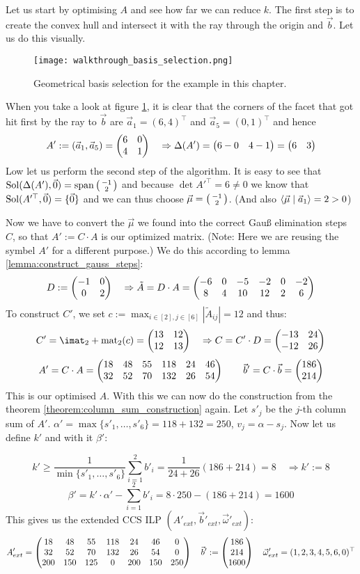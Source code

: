 Let us start by optimising $A$ and see how far we can reduce $k$. The first step is to create the convex hull and intersect it with the ray through the origin and $\vec b$. Let us do this visually.
\begin{figure}
    \centering
    \texttt{[image: walkthrough\_basis\_selection.png]}
    \caption{\label{fig:walkthrough_basis_selection} Geometrical basis selection for the example in this chapter.}
\end{figure}
When you take a look at figure \ref{fig:walkthrough_basis_selection}, it is clear that the corners of the facet that got hit first by the ray to $\vec b$ are $\vec a_1 = (6, 4)^\top$ and $\vec a_5 = (0, 1)^\top$ and hence
$$A' := (\vec a_1, \vec a_5) = \left(\begin{matrix}6&0\\4&1\end{matrix}\right) \quad \Rightarrow \Delta(A') = \left(\begin{matrix}6-0&4-1\end{matrix}\right) = \left(\begin{matrix}6&3\end{matrix}\right)$$
Low let us perform the second step of the algorithm. It is easy to see that $\operatorname{Sol}(\Delta(A'), \vec 0) = \operatorname{span}\left(\begin{smallmatrix}-1\\2\end{smallmatrix}\right)$ and because $\det A'^\top = 6 \neq 0$ we know that $\operatorname{Sol}(A'^\top, \vec 0) = \{\vec 0\}$ and we can thus choose $\vec\mu = \left(\begin{smallmatrix}-1\\2\end{smallmatrix}\right)$. (And also $\langle \vec\mu \mid \vec a_1 \rangle = 2 > 0$)

Now we have to convert the $\vec\mu$ we found into the correct Gauß elimination steps $C$, so that $A' := C\cdot A$ is our optimized matrix. (Note: Here we are reusing the symbel $A'$ for a different purpose.) We do this according to lemma \ref{lemma:construct_gauss_steps}:
$$D := \left(\begin{matrix}-1&0\\0&2\end{matrix}\right) \quad\Rightarrow \tilde A = D \cdot A = \left(\begin{matrix}-6&0&-5&-2&0&-2\\8&4&10&12&2&6\end{matrix}\right)$$
To construct $C'$, we set $c := \max_{i\in[2], j\in[6]}|\tilde A_{ij}| = 12$ and thus:
$$C' = \imat_2 + \opmat_2(c) = \mat{13&12\\12&13} \quad\Rightarrow C = C'\cdot D = \mat{-13&24\\-12&26}$$
$$A' = C \cdot A = \left(\begin{matrix}18&48&55&118&24&46\\32&52&70&132&26&54\end{matrix}\right)\qquad \vec b' = C\cdot \vec b = \left(\begin{matrix}186\\214\end{matrix}\right)$$
This is our optimised $A$. With this we can now do the construction from the theorem \ref{theorem:column_sum_construction} again. Let $s'_j$ be the $j$-th column sum of $A'$. $\alpha' = \max\{s'_1, \dots, s'_6\} = 118+132=250$, $v_j = \alpha - s_j$. Now let us define $k'$ and with it $\beta'$:

$$k' \geq \frac{1}{\min\{s'_1, \dots, s'_6\}} \sum_{i=1}^{2}b'_i = \frac{1}{24+26}(186+214) = 8 \quad \Rightarrow k' := 8$$ 
$$\beta' = k'\cdot\alpha' - \sum_{i=1}^{2}b'_i = 8\cdot250-(186+214) = 1600$$
This gives us the extended CCS ILP $(A'_{ext}, \vec b'_{ext}, \vec\omega'_{ext})$:
$$A'_{ext} = \left(\begin{matrix}18&48&55&118&24&46&0\\32&52&70&132&26&54&0\\200&150&125&0&200&150&250\end{matrix}\right)\quad\vec b':= \left(\begin{matrix}186\\214\\1600\end{matrix}\right)\quad \vec\omega'_{ext} = (1, 2, 3, 4, 5, 6, 0)^\top$$

